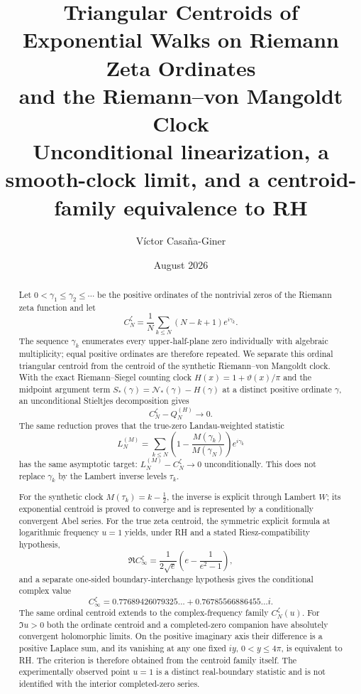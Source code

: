 \documentclass[11pt]{amsart}
\title[Triangular centroids of zeta ordinates]{Triangular Centroids of Exponential Walks on Riemann Zeta Ordinates\\
and the Riemann--von Mangoldt Clock\\[0.4em]
\large Unconditional linearization, a smooth-clock limit, and a centroid-family equivalence to RH}
\author{Víctor Casaña-Giner}
\date{August 2026}
\numberwithin{equation}{section}
\theoremstyle{definition}
\theoremstyle{remark}
\begin{document}
\begin{abstract}
Let $0<\gamma_1\leq\gamma_2\leq\cdots$ be the positive ordinates of the nontrivial zeros of the Riemann zeta function and let
\begin{equation}\label{eq:abstract_centroid}
C_N^{\zeta}=\frac1N\sum_{k\leq N}(N-k+1)e^{i\gamma_k}.
\end{equation}
The sequence $\gamma_k$ enumerates every upper-half-plane zero individually with algebraic multiplicity; equal positive ordinates are therefore repeated. We separate this ordinal triangular centroid from the centroid of the synthetic Riemann--von Mangoldt clock. With the exact Riemann--Siegel counting clock $H(x)=1+\vartheta(x)/\pi$ and the midpoint argument term $S_*(\gamma)=\mathcal N_*(\gamma)-H(\gamma)$ at a distinct positive ordinate $\gamma$, an unconditional Stieltjes decomposition gives
\begin{equation}\label{eq:abstract_level1_short}
C_N^{\zeta}-Q_N^{(H)}\longrightarrow0.
\end{equation}
The same reduction proves that the true-zero Landau-weighted statistic
\begin{equation}\label{eq:abstract_true_zero_landau}
L_N^{(M)}=\sum_{k\leq N}\left(1-\frac{M(\gamma_k)}{M(\gamma_N)}\right)e^{i\gamma_k}
\end{equation}
has the same asymptotic target: $L_N^{(M)}-C_N^{\zeta}\to0$ unconditionally. This does not replace $\gamma_k$ by the Lambert inverse levels $\tau_k$.

For the synthetic clock $M(\tau_k)=k-\tfrac12$, the inverse is explicit through Lambert $W$; its exponential centroid is proved to converge and is represented by a conditionally convergent Abel series. For the true zeta centroid, the symmetric explicit formula at logarithmic frequency $u=1$ yields, under RH and a stated Riesz-compatibility hypothesis,
\begin{equation}\label{eq:abstract_real_constant_short}
\Re C_\infty^{\zeta}=\frac{1}{2\sqrt e}\left(e-\frac1{e^2-1}\right),
\end{equation}
and a separate one-sided boundary-interchange hypothesis gives the conditional complex value
\begin{equation}\label{eq:abstract_complex_constant_short}
C_\infty^{\zeta}=0.77689426079325\ldots+0.76785566886455\ldots i.
\end{equation}
The same ordinal centroid extends to the complex-frequency family $C_N^{\zeta}(u)$. For $\Im u>0$ both the ordinate centroid and a completed-zero companion have absolutely convergent holomorphic limits. On the positive imaginary axis their difference is a positive Laplace sum, and its vanishing at any one fixed $iy$, $0<y\le4\pi$, is equivalent to RH. The criterion is therefore obtained from the centroid family itself. The experimentally observed point $u=1$ is a distinct real-boundary statistic and is not identified with the interior completed-zero series.
\end{abstract}
\end{document}
